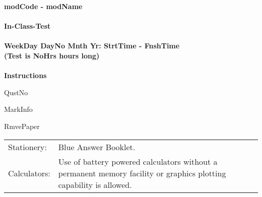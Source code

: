 \documentclass[a4paper, leqno, 12pt]{article} %
\newcommand\T{\rule{0pt}{2.6ex}}
\newcommand\B{\rule[-1.2ex]{0pt}{0pt}}
\begin{document}
\chead{}            %
\singlespacing

%
%

\begin{center}
\textbf{
modCode - modName
\\
\quad
\\
In-Class-Test
\\
\quad
\\
WeekDay DayNo Mnth Yr: StrtTime - FnshTime
\\
(Test is NoHrs hours long)
\\
\quad
\\
Instructions}
\end{center}

\singlespacing
\noindent
QustNo

\medskip
\noindent
MarkInfo

\medskip
\noindent
RmvePaper

\bigskip
\noindent
\begin{tabular}{l L{13cm}}
\T\B  Stationery: &	Blue Answer Booklet.\\
\T\B  Calculators: &	Use of battery powered calculators without a permanent memory facility or graphics plotting capability is allowed.\\
\end{tabular}

\newpage
\chead{\thepage}            %
\rfoot{}                %
\end{document}
